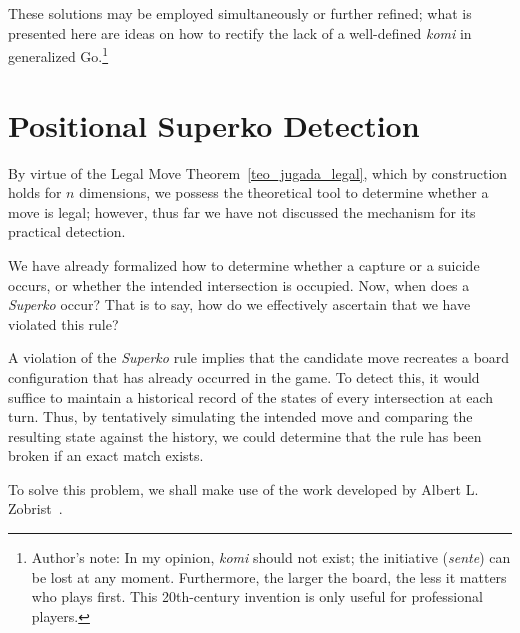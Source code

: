 These solutions may be employed simultaneously or further refined; what is presented here are ideas on how to rectify the lack of a well-defined \textit{komi} in generalized Go.\footnote{Author's note: In my opinion, \textit{komi} should not exist; the initiative (\textit{sente}) can be lost at any moment. Furthermore, the larger the board, the less it matters who plays first. This 20th-century invention is only useful for professional players.}

\section{Positional Superko Detection}\label{detec_superko}

By virtue of the Legal Move Theorem~\ref{teo_jugada_legal}, which by construction holds for $n$ dimensions, we possess the theoretical tool to determine whether a move is legal; however, thus far we have not discussed the mechanism for its practical detection.

We have already formalized how to determine whether a capture or a suicide occurs, or whether the intended intersection is occupied. Now, when does a \textit{Superko} occur? That is to say, how do we effectively ascertain that we have violated this rule?

A violation of the \textit{Superko} rule implies that the candidate move recreates a board configuration that has already occurred in the game. To detect this, it would suffice to maintain a historical record of the states of every intersection at each turn. Thus, by tentatively simulating the intended move and comparing the resulting state against the history, we could determine that the rule has been broken if an exact match exists.

To solve this problem, we shall make use of the work developed by Albert L. Zobrist~\cite{zobrist1970hashing}.



